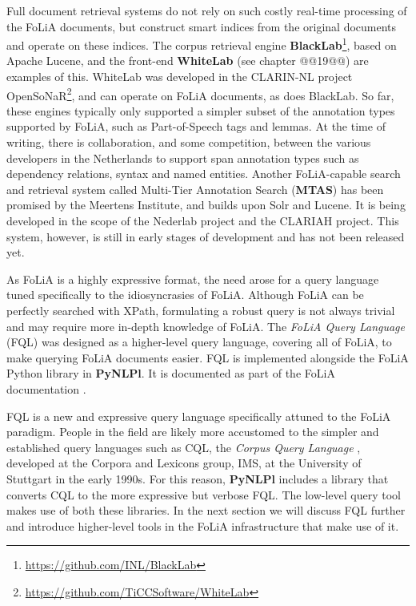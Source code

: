 \documentclass[a4paper,11pt]{article}
\begin{document}
Full document retrieval systems do not rely on such costly real-time processing
of the FoLiA documents, but construct smart indices from the original documents
and operate on these indices. The corpus retrieval engine
\textbf{BlackLab}\footnote{\url{https://github.com/INL/BlackLab}}, based on
Apache Lucene, and the front-end \textbf{WhiteLab}
\cite{ReynaertVandecampVanzaanen2014ColingDemo} (see chapter @@19@@) are examples of this. WhiteLab
was developed in the CLARIN-NL project
OpenSoNaR\footnote{\url{https://github.com/TiCCSoftware/WhiteLab}}, and can
operate on FoLiA documents, as does BlackLab. So far, these engines typically
only supported a simpler subset of the annotation types supported by FoLiA,
such as Part-of-Speech tags and lemmas.  At the time of writing, there is
collaboration, and some competition, between the various developers in the
Netherlands to support span annotation types such as dependency relations,
syntax and named entities. Another FoLiA-capable search and retrieval
system called Multi-Tier Annotation Search (\textbf{MTAS}) has been promised by
the Meertens Institute, and builds upon Solr and Lucene. It is being developed in
the scope of the Nederlab project \cite{Nederlab2016} and the CLARIAH project.
This system, however, is still in early stages of development and has not been released
yet.


As FoLiA is a highly expressive format, the need arose for a query language tuned specifically to the idiosyncrasies of
FoLiA. Although FoLiA can be perfectly searched with XPath, formulating a robust query is not always trivial and may
require more in-depth knowledge of FoLiA. The \emph{FoLiA Query Language} (FQL) was designed as a higher-level query
language, covering all of FoLiA, to make querying FoLiA documents easier. FQL is implemented alongside the FoLiA Python
library in \textbf{PyNLPl}. It is documented as part of the FoLiA documentation \cite{FOLIADOC2014}.

FQL is a new and expressive query language specifically attuned to the FoLiA
paradigm. People in the field are likely more accustomed to the simpler and
established query languages such as CQL, the \emph{Corpus Query Language}
\cite{CWB-Christ94}, developed at the Corpora and Lexicons group, IMS, at the
University of Stuttgart in the early 1990s. For this reason, \textbf{PyNLPl}
includes a library that converts CQL to the more expressive but verbose FQL.
The low-level query tool makes use of both these libraries. In the next section
we will discuss FQL further and introduce higher-level tools in the FoLiA
infrastructure that make use of it.
\end{document}
